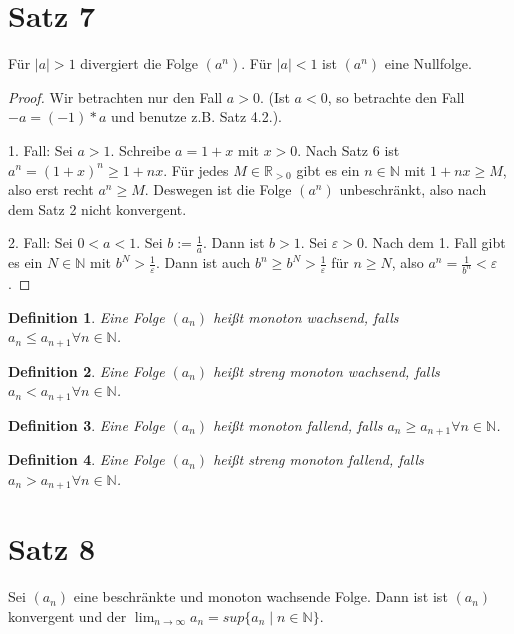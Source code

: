 \documentclass[a4paper,10pt]{article}
\newtheorem*{definition}{Definition}
\begin{document}
\section*{Satz 7}

Für $|a| > 1$ divergiert die Folge $(a^n)$. Für $|a| < 1$ ist $(a^n)$ eine Nullfolge.

\begin{proof}
 Wir betrachten nur den Fall $a > 0$. (Ist $a < 0$, so betrachte den Fall $-a = (-1) * a$ und benutze z.B. Satz 4.2.). 
 
 1. Fall: Sei $a > 1$. Schreibe $a = 1 + x$ mit $x > 0$. Nach Satz 6 ist $a^n = (1 + x)^n \ge 1 + nx$.
 Für jedes $M \in \mathbb{R}_{> 0}$ gibt es ein $n \in \mathbb{N}$ mit $1 + nx \ge M$, also erst recht $a^n \ge M$.
 Deswegen ist die Folge $(a^n)$ unbeschränkt, also nach dem Satz 2 nicht konvergent.
 
 2. Fall: Sei $0 < a < 1$.
 Sei $b := \frac{1}{a}$. Dann ist $b > 1$. 
 Sei $\varepsilon > 0$.
 Nach dem 1. Fall gibt es ein $N \in \mathbb{N}$ mit $b^N > \frac{1}{\varepsilon}$.
 Dann ist auch $b^n \ge b^N > \frac{1}{\varepsilon}$ für $n \ge N$, also $a^n = \frac{1}{b^n} < \varepsilon$.
\end{proof}

\begin{definition}
 Eine Folge $(a_n)$ heißt monoton wachsend, falls $a_n \le a_{n + 1} \forall n \in \mathbb{N}$.
\end{definition}

\begin{definition}
 Eine Folge $(a_n)$ heißt streng monoton wachsend, falls $a_n < a_{n + 1} \forall n \in \mathbb{N}$.
\end{definition}

\begin{definition}
 Eine Folge $(a_n)$ heißt monoton fallend, falls $a_n \ge a_{n + 1} \forall n \in \mathbb{N}$.
\end{definition}

\begin{definition}
 Eine Folge $(a_n)$ heißt streng monoton fallend, falls $a_n > a_{n + 1} \forall n \in \mathbb{N}$.
\end{definition}

\section*{Satz 8}

Sei $(a_n)$ eine beschränkte und monoton wachsende Folge.
Dann ist ist $(a_n)$ konvergent und der $\lim_{n \rightarrow \infty} a_n = sup\{a_n \mid n \in \mathbb{N}\}$.
\end{document}

